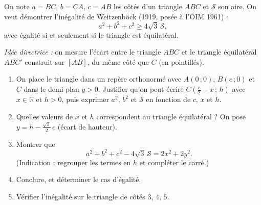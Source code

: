 On note $a = BC$, $b = CA$, $c = AB$ les côtés d'un triangle $ABC$ et
$\mathcal{S}$ son aire. On veut démontrer l'inégalité de Weitzenböck
(1919, posée à l'OIM 1961) :
\[
a^2 + b^2 + c^2 \geqslant 4\sqrt{3}\,\mathcal{S},
\]
avec égalité si et seulement si le triangle est équilatéral.

\emph{Idée directrice :} on mesure l'écart entre le triangle $ABC$ et le
triangle équilatéral $ABC'$ construit sur $[AB]$, du même côté que $C$
(en pointillés).

\begin{center}
\end{center}

\begin{enumerate}
  \item On place le triangle dans un repère orthonormé avec $A(0\,;0)$,
  $B(c\,;0)$ et $C$ dans le demi-plan $y > 0$. Justifier qu'on peut écrire
  $C\left(\frac{c}{2} - x\,;\,h\right)$ avec $x \in \mathbb{R}$ et $h > 0$,
  puis exprimer $a^2$, $b^2$ et $\mathcal{S}$ en fonction de $c$, $x$ et $h$.
  \item Quelles valeurs de $x$ et $h$ correspondent au triangle équilatéral ?
  On pose $y = h - \frac{\sqrt{3}}{2}\,c$ (écart de hauteur).
  \item Montrer que
  \[
  a^2 + b^2 + c^2 - 4\sqrt{3}\,\mathcal{S} = 2x^2 + 2y^2.
  \]
  (Indication : regrouper les termes en $h$ et compléter le carré.)
  \item Conclure, et déterminer le cas d'égalité.
  \item Vérifier l'inégalité sur le triangle de côtés $3$, $4$, $5$.
\end{enumerate}
